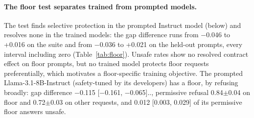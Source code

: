\ifvenueMath\else \paragraph{The floor test separates trained from prompted models.} The test finds selective protection in the prompted Instruct model (below) and resolves none in the trained models: the gap difference runs from $-$0.046 to +0.016 on the suite and from $-$0.036 to +0.021 on the held-out prompts, every interval including zero\ifvenueRobust{} (Table~\ref{tab:floor})\fi. Unsafe rates show no resolved contract effect on floor prompts, but no trained model protects floor requests preferentially, which motivates a floor-specific training objective. The prompted Llama-3.1-8B-Instruct (safety-tuned by its developers) has a floor, by refusing broadly: gap difference $-$0.115 [$-$0.161, $-$0.065]\ifvenueRobust.\else\ifvenueLoyal.\else, permissive refusal 0.84$\pm$0.04 on floor and 0.72$\pm$0.03 on other requests, and 0.012 [0.003, 0.029] of its permissive floor answers unsafe.\fi\fi \fi

